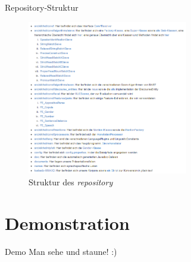 \documentclass[11pt,a4paper]{beamer}
\begin{document}
\begin{frame}{Repository-Struktur}
\begin{figure}
\begin{center}
\includegraphics[width=7cm]{repository_structure.png}
\caption{Struktur des \textit{repository}}
\label{fig:repository}
\end{center}
\end{figure}
\end{frame}

\section{Demonstration}
\begin{frame}{Demo}
Man sehe und staune! :)
\end{frame}
\end{document}
